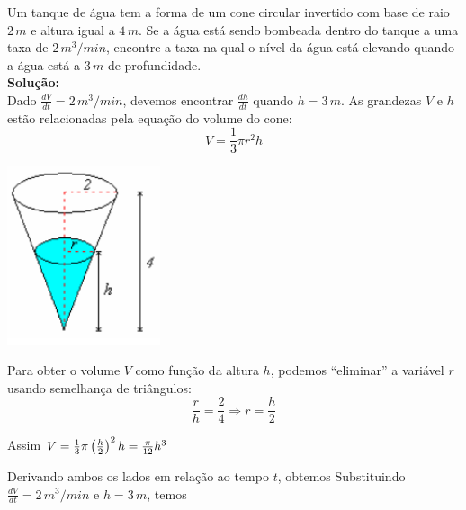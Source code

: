 \cleardoublepage\documentclass[../main.tex]{subfiles}
\begin{document}
\begin{ex}
Um tanque de água tem a forma de um cone circular invertido com base de raio $2\, m$ e altura igual a $4 \, m$. Se a água está sendo bombeada dentro do tanque a uma taxa de $2 \, m^3/min$, encontre  a taxa na qual o nível da água está elevando quando a água está a $3\, m$ de profundidade.\\
\textbf{Solução:}\\

   Dado $\frac{dV}{dt}=2 \, m^3/min$, devemos encontrar $\frac{dh}{dt}$ quando $h = 3\, m$. As grandezas $V$ e $h$ estão relacionadas pela equação do volume do cone: $$V=\frac{1}{3}\pi r^2 h$$
    \begin{minipage}{0.45\textwidth} 
    \includegraphics[width=4.5cm]{fig_apl_deriv/tanquecone.png}
    \end{minipage}
\hfill
 \begin{minipage}{0.55\textwidth} 
 Para obter o volume $V$ como função 
da altura $h$, podemos ``eliminar'' a variável $r$ usando semelhança de triângulos: 
$$\frac{r}{h}=\frac{2}{4}\Rightarrow r=\frac{h}{2}$$

Assim $V=\frac{1}{3}\pi\left(\frac{h}{2}\right)^2h=\frac{\pi}{12}h^3$
    \end{minipage}

Derivando ambos os lados em relação ao tempo $t$, obtemos 
Substituindo $\frac{dV}{dt}=2\, m^3/min$ e $h=3\, m$, temos
\end{ex}
\end{document}
